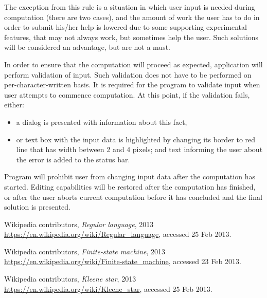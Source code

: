 \documentclass{article}
\begin{document}
The exception from this rule is a situation in which user input is needed during computation (there
are two cases), and the amount of work the user has to do in order to submit his/her help is lowered
due to some supporting experimental features, that may not always work, but sometimes help the user.
Such solutions will be considered an advantage, but are not a must.

In order to ensure that the computation will proceed as expected, application will perform
validation of input. Such validation does not have to be performed on per-character-written basis.
It is required for the program to validate input when user attempts to commence computation. At this
point, if the validation fails, either:

\begin{itemize}

  \item a dialog is presented with information about this fact,

  \item or text box with the input data is highlighted by changing its border to red line that has
  width between 2 and 4 pixels; and text informing the user about the error is added to the status
  bar.

\end{itemize}

Program will prohibit user from changing input data after the computation has started. Editing
capabilities will be restored after the computation has finished, or after the user aborts current
computation before it has concluded and the final solution is presented.

\newpage

\begin{thebibliography}{9}

  Wikipedia contributors,
  \emph{Regular language},
  2013
  \url{https://en.wikipedia.org/wiki/Regular_language}, accessed 25 Feb 2013.

  Wikipedia contributors,
  \emph{Finite-state machine},
  2013
  \url{https://en.wikipedia.org/wiki/Finite-state_machine}, accessed 23 Feb 2013.

  Wikipedia contributors,
  \emph{Kleene star},
  2013
  \url{https://en.wikipedia.org/wiki/Kleene_star}, accessed 25 Feb 2013.

\end{thebibliography}
\end{document}
